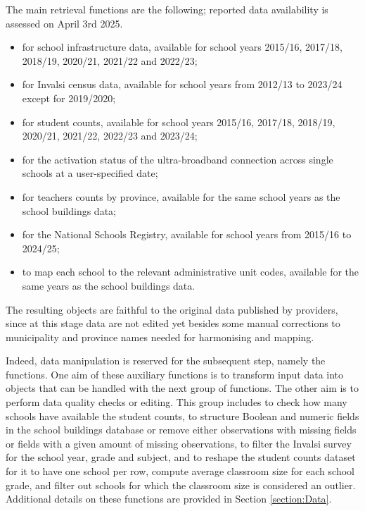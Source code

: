 \documentclass[openany]{book}
\begin{document}
The main retrieval functions are the following; reported data availability is assessed on April 3rd 2025.
\begin{itemize}
    \item \texttt{} for school infrastructure data, available for school years 2015/16, 2017/18, 2018/19, 2020/21, 2021/22 and 2022/23;
    \item \texttt{} for Invalsi census data, available for school years from 2012/13 to 2023/24 except for 2019/2020; 
    \item \texttt{} for student counts, available for school years 2015/16, 2017/18, 2018/19, 2020/21, 2021/22, 2022/23 and 2023/24;
    \item \texttt{} for the activation status of the ultra-broadband connection across single schools at a user-specified date;
    \item \texttt{} for teachers counts by province, available for the same school years as the school buildings data;
    \item \texttt{} for the National Schools Registry, available for school years from 2015/16 to 2024/25;
    \item \texttt{} to map each school to the relevant administrative unit codes, available for the same years as the school buildings data.
\end{itemize}
The resulting objects are faithful to the original data published by providers, since at this stage data are not edited yet besides some manual corrections to municipality and province names needed for harmonising and mapping. 

Indeed, data manipulation is reserved for the subsequent step, namely the \texttt{} functions. One aim of these auxiliary functions is to transform input data into objects that can be handled with the next group of functions. The other aim is to perform data quality checks or editing. This group includes \texttt{} to check how many schools have available the student counts, \texttt{} to structure Boolean and numeric fields in the school buildings database or remove either observations with missing fields or fields with a given amount of missing observations, \texttt{} to filter the Invalsi survey for the school year, grade and subject, and \texttt{} to reshape the student counts dataset for it to have one school per row, compute average classroom size for each school grade, and filter out schools for which the classroom size is considered an outlier. Additional details on these functions are provided in Section \ref{section:Data}. 
\end{document}
